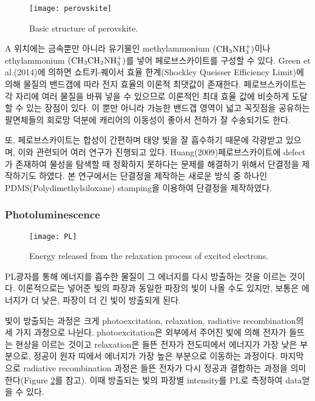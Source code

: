 \begin{figure}[H]
	\begin{center}
			\texttt{[image: perovskite]}
	\end{center}
	\caption{Basic structure of perovskite.}
	\label{fig:perov} 
\end{figure}

A 위치에는 금속뿐만 아니라 유기물인  methylammonium $\rm(CH_3NH_3^+)$이나 ethylammonium $\rm(CH_3CH_2NH_3^+)$를 넣어 페로브스카이트를 구성할 수 있다. Green et al.(2014)에 의하면 쇼트키-퀘이서 효율 한계(Shockley Queisser Efficiency Limit)에 의해 물질의 밴드갭에 따라 전지 효율의 이론적 최댓값이 존재한다\cite{green2014emergence}. 페로브스카이트는 각 자리에 여러 물질을 바꿔 넣을 수 있으므로 이론적인 최대 효율 값에 비슷하게 도달할 수 있는 장점이 있다. 이 뿐만 아니라 가능한 밴드갭 영역이 넓고 꼭짓점을 공유하는 팔면체들의 회로망 덕분에 캐리어의 이동성이 좋아서 전하가 잘 수송되기도 한다\cite{green2014emergence}.

또, 페로브스카이트는 합성이 간편하며 태양 빛을 잘 흡수하기 때문에 각광받고 있으며, 이와 관련되어 여러 연구가 진행되고 있다. Huang(2009)\은 페로브스카이트에 defect가 존재하여 물성을 탐색할 때 정확하지 못하다는 문제를 해결하기 위해서 단결정을 제작하기도 하였다\cite{huang2009fabrication}. 본 연구에서는 단결정을 제작하는 새로운 방식 중 하나인 PDMS(Polydimethylsiloxane) stamping을 이용하여 단결정을 제작하였다.
\\

\subsubsection{Photoluminescence}

\begin{figure}[H]
	\begin{center}
			\texttt{[image: PL]}
	\end{center}
	\caption{Energy released from the relaxation process of excited electrons.}
	\label{fig:pl} 
\end{figure}

PL\는 광자를 통해 에너지를 흡수한 물질이 그 에너지를 다시 방출하는 것을 이르는 것이다. 이론적으로는 넣어준 빛의 파장과 동일한 파장의 빛이 나올 수도 있지만, 보통은 에너지가 더 낮은, 파장이 더 긴 빛이 방출되게 된다. 

빛이 방출되는 과정은 크게 photoexcitation, relaxation, radiative recombination의 세 가지 과정으로 나뉜다. photoexcitation은 외부에서 주어진 빛에 의해 전자가 들뜨는 현상을 이르는 것이고 relaxation은 들뜬 전자가 전도띠에서 에너지가 가장 낮은 부분으로, 정공이 원자 띠에서 에너지가 가장 높은 부분으로 이동하는 과정이다. 마지막으로 radiative recombination 과정은 들뜬 전자가 다시 정공과 결합하는 과정을 의미한다(Figure \ref{fig:pl}를 참고). 이때 방출되는 빛의 파장별 intensity를 PL로 측정하여 data\를 얻을 수 있다.
\\

